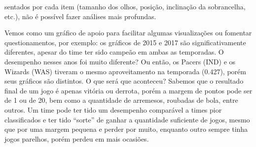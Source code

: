 \documentclass[
]{book}
\begin{document}
sentados por cada item (tamanho dos olhos, posição, inclinação da sobrancelha, etc.), não é possível fazer análises mais profundas.

Vemos como um gráfico de apoio para facilitar algumas visualizações ou fomentar questionamentos, por exemplo: os gráficos de 2015 e 2017 são significativamente diferentes, apesar do time ter sido campeão em ambas as temporadas. O desempenho nesses anos foi muito diferente? Ou então, os Pacers (IND) e os Wizards (WAS) tiveram o mesmo aproveitamento na temporada (0.427), porém seus gráficos são distintos. O que será que aconteceu? Sabemos que o resultado final de um jogo é apenas vitória ou derrota, porém a margem de pontos pode ser de 1 ou de 20, bem como a quantidade de arremesos, roubadas de bola, entre outros. Um time pode ter tido um desempenho comparável a times pior classificados e ter tido ``sorte'' de ganhar a quantidade suficiente de jogos, mesmo que por uma margem pequena e perder por muito, enquanto outro sempre tinha jogos parelhos, porém perdeu em mais ocasiões.

  
\end{document}
